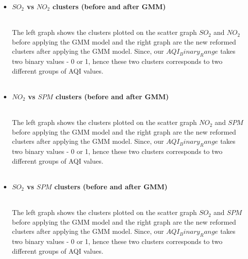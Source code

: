 \documentclass{article}
\begin{document}
\begin{itemize}
\item \textbf{$SO_2$ vs $NO_2$ clusters (before and after GMM)}

%
    \qquad
{}%
\\ The left graph shows the clusters plotted on the scatter graph $SO_2$ and $NO_2$ before applying the GMM model and the right graph are the new reformed clusters after applying the GMM model. Since, our $AQI_Binary_Range$ takes two binary values - 0 or 1, hence these two clusters corresponds to two different groups of AQI values.  \\ \\
\end{itemize}

\begin{itemize}
\item \textbf{$NO_2$ vs $SPM$ clusters (before and after GMM)}

%
    \qquad
{}%
\\ The left graph shows the clusters plotted on the scatter graph $NO_2$ and $SPM$ before applying the GMM model and the right graph are the new reformed clusters after applying the GMM model. Since, our $AQI_Binary_Range$ takes two binary values - 0 or 1, hence these two clusters corresponds to two different groups of AQI values.  \\ \\\newpage
\end{itemize}

\begin{itemize}
\item \textbf{$SO_2$ vs $SPM$ clusters (before and after GMM)}

%
    \qquad
{}%
\\ The left graph shows the clusters plotted on the scatter graph $SO_2$ and $SPM$ before applying the GMM model and the right graph are the new reformed clusters after applying the GMM model. Since, our $AQI_Binary_Range$ takes two binary values - 0 or 1, hence these two clusters corresponds to two different groups of AQI values.  \\
\end{itemize}
\end{document}
